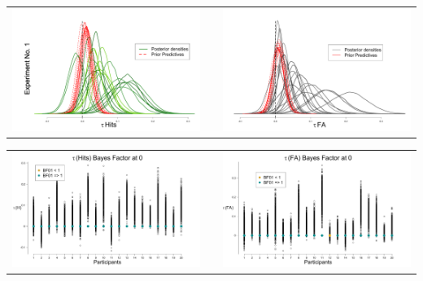 \documentclass[final]{beamer}
\newlength{\onecolwid}
\newlength{\twocolwid}
\begin{document}
\begin{frame}[t]
\begin{columns}[t]
\begin{column}{\twocolwid}
\begin{columns}[t,totalwidth=\twocolwid]
\begin{column}{\onecolwid}
\begin{alertblock}{}
\vspace{1cm}

\begin{center}
\begin{tabular}{ccc}
\includegraphics[width=0.48\linewidth]{Figures/3-Exp1_TauH.pdf}  & \hfill & \includegraphics[width=0.48\linewidth]{Figures/3-Exp1_TauF.pdf}
\end{tabular}
\end{center}

\begin{center}
\begin{tabular}{ccc}
\includegraphics[width=0.48\linewidth]{Figures/3-Exp1_BFH0.pdf}  & \hfill & \includegraphics[width=0.48\linewidth]{Figures/3-Exp1_BFF0.pdf}
\end{tabular}
\end{center}

\vspace{0.75cm}


\end{alertblock}
\end{column}
\end{columns}
\end{column}
\end{columns}
\end{frame}
\end{document}
